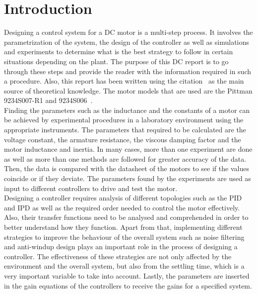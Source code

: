 \section{Introduction}

Designing a control system for a DC motor is a multi-step process. It involves the parametrization of the system, the design of the controller as well as simulations and experiments to determine what is the best strategy to follow in certain situations depending on the plant. The purpose of this DC report is to go through these steps and provide the reader with the information required in such a procedure. Also, this report has been written using the citation~\cite{feedback} as the main source of theoretical knowledge. The motor models that are used are the Pittman 9234S007-R1 and 9234S006~\cite{pittmann}.
\\

Finding the parameters such as the inductance and the constants of a motor can be achieved by experimental procedures in a laboratory environment using the appropriate instruments. The parameters that required to be calculated are the voltage constant, the armature resistance, the viscous damping factor and the motor inductance and inertia. In many cases, more than one experiment are done as well as more than one methods are followed for greater accuracy of the data. Then, the data is compared with the datasheet of the motors to see if the values coincide or if they deviate. The parameters found by the experiments are used as input to different controllers to drive and test the motor. 
\\

Designing a controller requires analysis of different topologies such as the PID and IPD as well as the required order needed to control the motor effectively. Also, their transfer functions need to be analysed and comprehended in order to better understand how they function. Apart from that, implementing different strategies to improve the behaviour of the overall system such as noise filtering and anti-windup design plays an important role in the process of designing a controller. The effectiveness of these strategies are not only affected by the environment and the overall system, but also from the settling time, which is a very important variable to take into account. Lastly, the parameters are inserted in the gain equations of the controllers to receive the gains for a specified system.
\\

